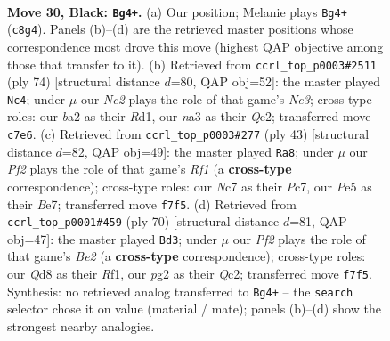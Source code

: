 \documentclass[11pt]{article}
\begin{document}
\clearpage

\begin{figure}[p]\centering
\begin{subfigure}{0.46\textwidth}\centering
\resizebox{\linewidth}{!}{%
\newchessgame
\chessboard[
  setfen={2bq3r/2n2pk1/p5p1/n1Q1p2p/P3P3/N1PP3N/B3KPPP/R7 b - - 0 30},
  showmover=false,
  pgfstyle=straightmove, color=movearrow, markmove={c8-g4}
]}
\caption{}
\end{subfigure}\hfill
\begin{subfigure}{0.46\textwidth}\centering
\resizebox{\linewidth}{!}{%
\newchessgame
\chessboard[
  setfen={3r2k1/p2b1pp1/1p1P1n1p/2p1q3/P6P/1P2NBP1/2Q2P2/3R2K1 w - - 19 38},
  showmover=false,
  pgfstyle=straightmove, color=movearrow, markmove={e3-c4}
]}
\caption{}
\end{subfigure}
\\[4pt]
\begin{subfigure}{0.46\textwidth}\centering
\resizebox{\linewidth}{!}{%
\newchessgame
\chessboard[
  setfen={5rk1/1qp1bppp/4p3/Q1n1P3/2p5/2N1B1P1/1P2PP1P/3R2K1 b - - 1 22},
  showmover=false,
  pgfstyle=straightmove, color=movearrow, markmove={f8-a8}
]}
\caption{}
\end{subfigure}\hfill
\begin{subfigure}{0.46\textwidth}\centering
\resizebox{\linewidth}{!}{%
\newchessgame
\chessboard[
  setfen={r7/2pb2k1/1p1n2pp/2pP4/2Pp2Pq/5P2/N1Q1BN2/1K3R2 w - - 2 36},
  showmover=false,
  pgfstyle=straightmove, color=movearrow, markmove={e2-d3}
]}
\caption{}
\end{subfigure}
\caption{\textbf{Move 30, Black: \texttt{Bg4+}.} (a) Our position; Melanie plays \texttt{Bg4+} (\texttt{c8g4}). Panels (b)--(d) are the retrieved master positions whose correspondence most drove this move (highest QAP objective among those that transfer to it). (b) Retrieved from \texttt{ccrl\_top\_p0003\#2511} (ply 74) [structural distance $d$=80, QAP obj=52]: the master played \texttt{Nc4}; under $\mu$ our \emph{Nc2} plays the role of that game's \emph{Ne3}; cross-type roles: our \emph{b}a2 as their \emph{R}d1, our \emph{n}a3 as their \emph{Q}c2; transferred move \texttt{c7e6}. (c) Retrieved from \texttt{ccrl\_top\_p0003\#277} (ply 43) [structural distance $d$=82, QAP obj=49]: the master played \texttt{Ra8}; under $\mu$ our \emph{Pf2} plays the role of that game's \emph{Rf1} (a \textbf{cross-type} correspondence); cross-type roles: our \emph{N}c7 as their \emph{P}c7, our \emph{P}e5 as their \emph{B}e7; transferred move \texttt{f7f5}. (d) Retrieved from \texttt{ccrl\_top\_p0001\#459} (ply 70) [structural distance $d$=81, QAP obj=47]: the master played \texttt{Bd3}; under $\mu$ our \emph{Pf2} plays the role of that game's \emph{Be2} (a \textbf{cross-type} correspondence); cross-type roles: our \emph{Q}d8 as their \emph{R}f1, our \emph{p}g2 as their \emph{Q}c2; transferred move \texttt{f7f5}. Synthesis: no retrieved analog transferred to \texttt{Bg4+} -- the \texttt{search} selector chose it on value (material / mate); panels (b)--(d) show the strongest nearby analogies.}
\label{fig:thought-m59}
\end{figure}
\end{document}

